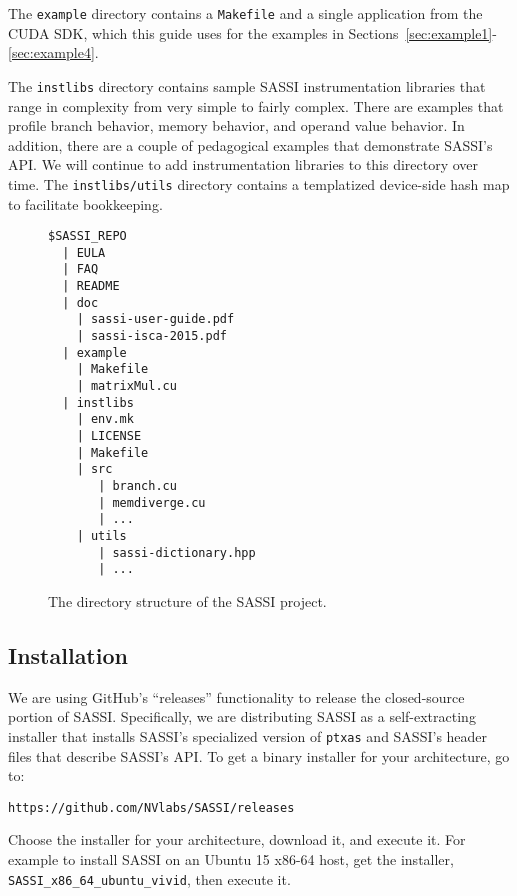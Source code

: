 The \texttt{example} directory contains a \texttt{Makefile} and a
single application from the CUDA SDK, which this guide uses for the
examples in Sections~\ref{sec:example1}-\ref{sec:example4}.

The \texttt{instlibs} directory contains sample SASSI instrumentation
libraries that range in complexity from very simple to fairly complex.
There are examples that profile branch behavior, memory behavior, and
operand value behavior.  In addition, there are a couple of
pedagogical examples that demonstrate SASSI's API.  We will continue
to add instrumentation libraries to this directory over time.  The
\texttt{instlibs/utils} directory contains a templatized device-side
hash map to facilitate bookkeeping.

\begin{figure*}
\center
\begin{verbatim}
$SASSI_REPO
  | EULA
  | FAQ
  | README
  | doc
    | sassi-user-guide.pdf
    | sassi-isca-2015.pdf
  | example
    | Makefile
    | matrixMul.cu 
  | instlibs
    | env.mk
    | LICENSE
    | Makefile
    | src
       | branch.cu
       | memdiverge.cu
       | ...
    | utils
       | sassi-dictionary.hpp
       | ...
\end{verbatim}
\caption{The directory structure of the SASSI project.}
\label{fig:structure}
\end{figure*}

\subsection{Installation}

We are using GitHub's ``releases'' functionality to release the
closed-source portion of SASSI.  Specifically, we are distributing
SASSI as a self-extracting installer that installs SASSI's specialized
version of \texttt{ptxas} and SASSI's header files that describe
SASSI's API.  To get a binary installer for your architecture, go to:\\
\begin{center}
\texttt{https://github.com/NVlabs/SASSI/releases}
\end{center}
Choose the installer for your architecture, download it, and execute it.
For example to install SASSI on an Ubuntu 15 x86-64 host, get the
installer, \texttt{SASSI\_x86\_64\_ubuntu\_vivid}, then execute it.

